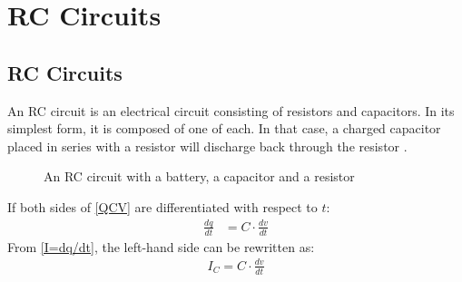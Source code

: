 \chapter{RC Circuits}
\section{RC Circuits}
An RC circuit is an electrical circuit consisting of resistors and capacitors. In its simplest form, it is composed of one of each. In that case, a charged capacitor placed in series with a resistor will discharge back through the resistor \cite[p~21]{artof}. 

\begin{figure}[H]
 
 \caption{An RC circuit with a battery, a capacitor and a resistor}
\end{figure}

\noindent If both sides of \eqref{QCV} are differentiated  with respect to $t$:
\begin{align}
	\frac{dq}{dt} &= C \cdot \frac{dv}{dt} 
\end{align}
From \eqref{I=dq/dt}, the left-hand side can be rewritten as:
\begin{align}
	I_C = C \cdot \frac{dv}{dt}\label{I_C}
\end{align}
